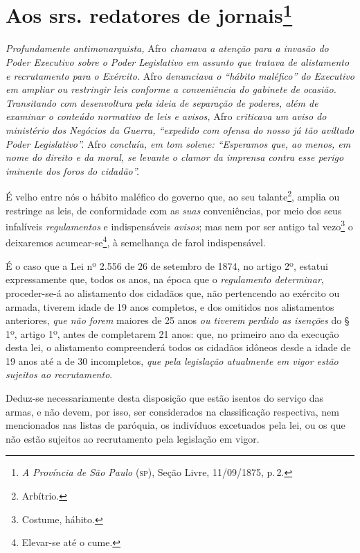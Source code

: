\chapter{Aos srs. redatores de jornais\footnote{\emph{A Província de São Paulo} (\textsc{sp}), Seção Livre,
  11/09/1875, p.\,2.}} %

\begin{didascalia}
\emph{Profundamente antimonarquista,} Afro \emph{chamava a atenção para
a invasão do Poder Executivo sobre o Poder Legislativo em assunto que
tratava de alistamento e recrutamento para o Exército.} Afro
\emph{denunciava o ``hábito maléfico'' do Executivo em ampliar ou
restringir leis conforme a conveniência do gabinete de ocasião.
Transitando com desenvoltura pela ideia de separação de poderes, além de
examinar o conteúdo normativo de leis e avisos,} Afro \emph{criticava um
aviso do ministério dos Negócios da Guerra, ``expedido com ofensa do
nosso já tão aviltado Poder Legislativo''.} Afro \emph{concluía, em tom
solene: ``Esperamos que, ao menos, em nome do direito e da moral, se
levante o clamor da imprensa contra esse perigo iminente dos foros do
cidadão''.}
\end{didascalia}

É velho entre nós o hábito maléfico do governo que, ao seu
talante\footnote{ Arbítrio.}, amplia ou restringe as leis, de
conformidade com as \emph{suas} conveniências, por meio dos seus
infalíveis \emph{regulamentos} e indispensáveis \emph{avisos}; mas nem
por ser antigo tal vezo\footnote{ Costume, hábito.} o deixaremos
acumear-se\footnote{ Elevar-se até o cume.}, à semelhança de farol
indispensável.

É o caso que a Lei nº 2.556 de 26 de setembro de 1874, no artigo 2º,
estatui expressamente que, todos os anos, na época que o
\emph{regulamento determinar}, proceder-se-á ao alistamento dos cidadãos
que, não pertencendo ao exército ou armada, tiverem idade de 19 anos
completos, e dos omitidos nos alistamentos anteriores, \emph{que não
forem} maiores de 25 anos \emph{ou tiverem perdido as isenções} do § 1º,
artigo 1º, antes de completarem 21 anos: que, no primeiro ano da
execução desta lei, o alistamento compreenderá todos os cidadãos idôneos
desde a idade de 19 anos até a de 30 incompletos, \emph{que pela
legislação atualmente em vigor estão sujeitos ao recrutamento}.

Deduz-se necessariamente desta disposição que estão isentos do serviço
das armas, e não devem, por isso, ser considerados na classificação
respectiva, nem mencionados nas listas de paróquia, os indivíduos
excetuados pela lei, ou os que não estão sujeitos ao recrutamento pela
legislação em vigor.

